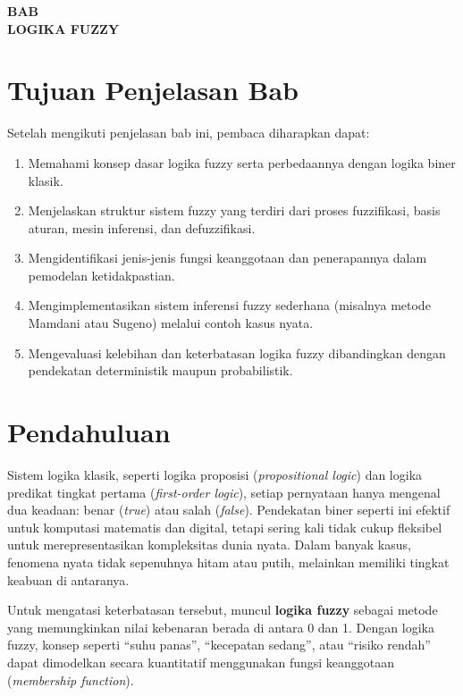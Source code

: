\documentclass[12pt,a4paper]{article}
\theoremstyle{remark}
\begin{document}
\begin{center}
    \Large \textbf{BAB}\\[1em]
    \large \textbf{LOGIKA FUZZY}\\[2em]
\end{center}

\section{Tujuan Penjelasan Bab}
Setelah mengikuti penjelasan bab ini, pembaca diharapkan dapat:
\begin{enumerate}
    \item Memahami konsep dasar logika fuzzy serta perbedaannya dengan logika biner klasik.
    \item Menjelaskan struktur sistem fuzzy yang terdiri dari proses fuzzifikasi, basis aturan, mesin inferensi, dan defuzzifikasi.
    \item Mengidentifikasi jenis-jenis fungsi keanggotaan dan penerapannya dalam pemodelan ketidakpastian.
    \item Mengimplementasikan sistem inferensi fuzzy sederhana (misalnya metode Mamdani atau Sugeno) melalui contoh kasus nyata.
    \item Mengevaluasi kelebihan dan keterbatasan logika fuzzy dibandingkan dengan pendekatan deterministik maupun probabilistik.
\end{enumerate}


\section{Pendahuluan}

Sistem logika klasik, seperti logika proposisi (\textit{propositional logic}) dan logika predikat tingkat pertama (\textit{first-order logic}), setiap pernyataan hanya mengenal dua keadaan: benar (\textit{true}) atau salah (\textit{false}). Pendekatan biner seperti ini efektif untuk komputasi matematis dan digital, 
tetapi sering kali tidak cukup fleksibel untuk merepresentasikan kompleksitas dunia nyata. 
Dalam banyak kasus, fenomena nyata tidak sepenuhnya hitam atau putih, 
melainkan memiliki tingkat keabuan di antaranya.

Untuk mengatasi keterbatasan tersebut, muncul \textbf{logika fuzzy} 
sebagai metode yang memungkinkan nilai kebenaran berada di antara 0 dan 1. 
Dengan logika fuzzy, konsep seperti “suhu panas”, “kecepatan sedang”, 
atau “risiko rendah” dapat dimodelkan secara kuantitatif menggunakan 
fungsi keanggotaan (\textit{membership function}).
\end{document}
